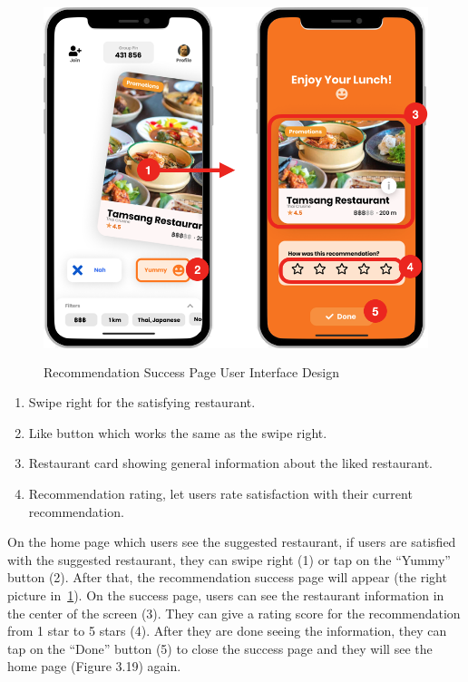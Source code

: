 \documentclass[12pt,oneside,openright,a4paper]{cpe-english-project}
\begin{document}
\begin{figure}[!h]\centering
\includegraphics[height=300pt]{./images/3ui_RecommendationSuccessPageUserInterfaceDesign.png}
\caption{Recommendation Success Page User Interface Design}\label{fig:3ui_RecommendationSuccessPageUserInterfaceDesign}
\end{figure}
\begin{enumerate}
\item Swipe right for the satisfying restaurant.
\item Like button which works the same as the swipe right.
\item Restaurant card showing general information about the liked restaurant.
\item Recommendation rating, let users rate satisfaction with their current recommendation.
\end{enumerate}
On the home page which users see the suggested restaurant, if users are satisfied with the suggested restaurant, they can swipe right (1) or tap on the “Yummy” button (2). After that, the recommendation success page will appear (the right picture in~\ref{fig:3ui_RecommendationSuccessPageUserInterfaceDesign}). On the success page, users can see the restaurant information in the center of the screen (3). They can give a rating score for the recommendation from 1 star to 5 stars (4). After they are done seeing the information, they can tap on the “Done” button (5) to close the success page and they will see the home page (Figure 3.19) again.
\newpage
\end{document}
